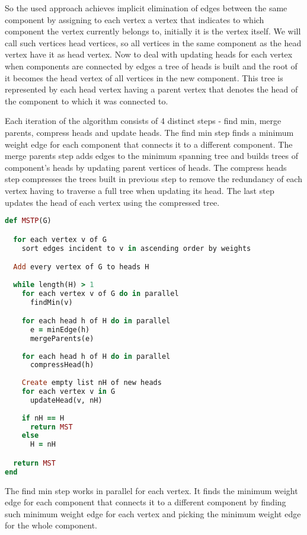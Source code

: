 \documentclass{report}
\theoremstyle{plain}
\theoremstyle{definition}
\theoremstyle{remark}
\begin{document}
So the used approach achieves implicit elimination of edges between the same component by assigning to each vertex a vertex that indicates to which component the vertex currently belongs to, initially it is the vertex itself. We will call such vertices head vertices, so all vertices in the same component as the head vertex have it as head vertex. Now to deal with updating heads for each vertex when components are connected by edges a tree of heads is built and the root of it becomes the head vertex of all vertices in the new component. This tree is represented by each head vertex having a parent vertex that denotes the head of the component to which it was connected to.

Each iteration of the algorithm consists of 4 distinct steps - find min, merge parents, compress heads and update heads. The find min step finds a minimum weight edge for each component that connects it to a different component. The merge parents step adds edges to the minimum spanning tree and builds trees of component's heads by updating parent vertices of heads. The compress heads step compresses the trees built in previous step to remove the redundancy of each vertex having to traverse a full tree when updating its head. The last step updates the head of each vertex using the compressed tree.

\begin{lstlisting}[language=Ruby]
def MSTP(G)

  for each vertex v of G
    sort edges incident to v in ascending order by weights

  Add every vertex of G to heads H
  
  while length(H) > 1
    for each vertex v of G do in parallel
      findMin(v)

    for each head h of H do in parallel
      e = minEdge(h)
      mergeParents(e)
  
    for each head h of H do in parallel
      compressHead(h)
    
    Create empty list nH of new heads
    for each vertex v in G
      updateHead(v, nH)
    
    if nH == H
      return MST
    else
      H = nH

  return MST
end
\end{lstlisting}

The find min step works in parallel for each vertex. It finds the minimum weight edge for each component that connects it to a different component by finding such minimum weight edge for each vertex and picking the minimum weight edge for the whole component.
\end{document}
